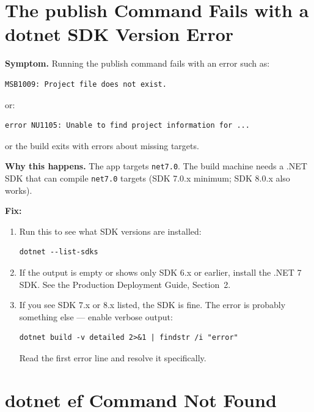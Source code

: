 \documentclass[a4paper,11pt]{article}
\begin{document}
\section{The publish Command Fails with a dotnet SDK Version Error}
\label{sec:sdkversion}

\textbf{Symptom.}
Running the publish command fails with an error such as:

\begin{lstlisting}
MSB1009: Project file does not exist.
\end{lstlisting}
or:
\begin{lstlisting}
error NU1105: Unable to find project information for ...
\end{lstlisting}
or the build exits with errors about missing targets.

\textbf{Why this happens.}
The app targets \texttt{net7.0}.
The build machine needs a .NET SDK that can compile \texttt{net7.0} targets
(SDK 7.0.x minimum; SDK 8.0.x also works).

\textbf{Fix:}

\begin{enumerate}
  \item Run this to see what SDK versions are installed:
\begin{lstlisting}
dotnet --list-sdks
\end{lstlisting}
  \item If the output is empty or shows only SDK 6.x or earlier,
        install the .NET 7 SDK.
        See the Production Deployment Guide, Section~2.
  \item If you see SDK 7.x or 8.x listed, the SDK is fine.
        The error is probably something else --- enable verbose output:
\begin{lstlisting}
dotnet build -v detailed 2>&1 | findstr /i "error"
\end{lstlisting}
        Read the first error line and resolve it specifically.
\end{enumerate}

\section{dotnet ef Command Not Found}
\label{sec:efnotfound}
\end{document}
